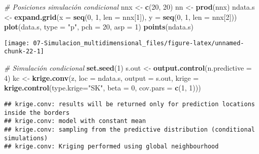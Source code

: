\documentclass[
]{book}
\newenvironment{Shaded}{\begin{snugshade}}{\end{snugshade}}
\newcommand{\CommentTok}[1]{\textcolor[rgb]{0.56,0.35,0.01}{\textit{#1}}}
\newcommand{\DataTypeTok}[1]{\textcolor[rgb]{0.13,0.29,0.53}{#1}}
\newcommand{\DecValTok}[1]{\textcolor[rgb]{0.00,0.00,0.81}{#1}}
\newcommand{\KeywordTok}[1]{\textcolor[rgb]{0.13,0.29,0.53}{\textbf{#1}}}
\newcommand{\NormalTok}[1]{#1}
\newcommand{\StringTok}[1]{\textcolor[rgb]{0.31,0.60,0.02}{#1}}
\theoremstyle{break}
\theoremstyle{definition}
\theoremstyle{definition}
\theoremstyle{definition}
\theoremstyle{remark}
\begin{document}
\begin{Shaded}
\begin{Highlighting}[]
\CommentTok{# Posiciones simulación condicional}
\NormalTok{nnx <-}\StringTok{ }\KeywordTok{c}\NormalTok{(}\DecValTok{20}\NormalTok{, }\DecValTok{20}\NormalTok{)}
\NormalTok{nn <-}\StringTok{ }\KeywordTok{prod}\NormalTok{(nnx)}
\NormalTok{ndata.s <-}\StringTok{ }\KeywordTok{expand.grid}\NormalTok{(}\DataTypeTok{x =} \KeywordTok{seq}\NormalTok{(}\DecValTok{0}\NormalTok{, }\DecValTok{1}\NormalTok{, }\DataTypeTok{len =}\NormalTok{ nnx[}\DecValTok{1}\NormalTok{]), }\DataTypeTok{y =} \KeywordTok{seq}\NormalTok{(}\DecValTok{0}\NormalTok{, }\DecValTok{1}\NormalTok{, }\DataTypeTok{len =}\NormalTok{ nnx[}\DecValTok{2}\NormalTok{]))}
\KeywordTok{plot}\NormalTok{(data.s, }\DataTypeTok{type =} \StringTok{"p"}\NormalTok{, }\DataTypeTok{pch =} \DecValTok{20}\NormalTok{, }\DataTypeTok{asp =} \DecValTok{1}\NormalTok{)}
\KeywordTok{points}\NormalTok{(ndata.s)}
\end{Highlighting}
\end{Shaded}

\begin{center}\texttt{[image: 07-Simulacion\_multidimensional\_files/figure-latex/unnamed-chunk-22-1]} \end{center}

\begin{Shaded}
\begin{Highlighting}[]
\CommentTok{# Simulación condicional}
\KeywordTok{set.seed}\NormalTok{(}\DecValTok{1}\NormalTok{)}
\NormalTok{s.out <-}\StringTok{ }\KeywordTok{output.control}\NormalTok{(}\DataTypeTok{n.predictive =} \DecValTok{4}\NormalTok{)}
\NormalTok{kc <-}\StringTok{ }\KeywordTok{krige.conv}\NormalTok{(z, }\DataTypeTok{loc =}\NormalTok{ ndata.s, }\DataTypeTok{output =}\NormalTok{ s.out,}
                 \DataTypeTok{krige =} \KeywordTok{krige.control}\NormalTok{(}\DataTypeTok{type.krige=}\StringTok{"SK"}\NormalTok{, }\DataTypeTok{beta =} \DecValTok{0}\NormalTok{, }\DataTypeTok{cov.pars =} \KeywordTok{c}\NormalTok{(}\DecValTok{1}\NormalTok{, }\DecValTok{1}\NormalTok{)))}
\end{Highlighting}
\end{Shaded}

\begin{verbatim}
## krige.conv: results will be returned only for prediction locations inside the borders
## krige.conv: model with constant mean
## krige.conv: sampling from the predictive distribution (conditional simulations)
## krige.conv: Kriging performed using global neighbourhood
\end{verbatim}
\end{document}

